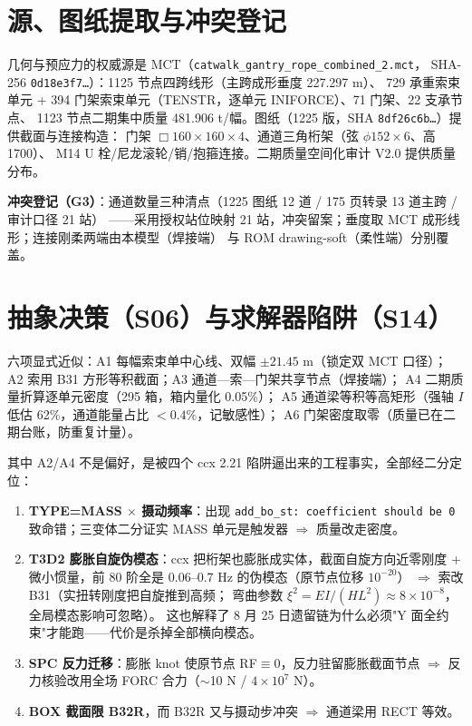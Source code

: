 \documentclass[11pt,a4paper]{ctexart}
\begin{document}
\section{源、图纸提取与冲突登记}

几何与预应力的权威源是 MCT（\texttt{catwalk\_gantry\_rope\_combined\_2.mct}，
SHA-256 \texttt{0d18e3f7\ldots}）：1125 节点四跨线形（主跨成形垂度 227.297 m）、
729 承重索束单元 + 394 门架索束单元（TENSTR，逐单元 INIFORCE）、71 门架、22 支承节点、
1123 节点二期集中质量 481.906 t/幅。图纸（1225 版，SHA \texttt{8df26c6b\ldots}）提供截面与连接构造：
门架 $\Box160\times160\times4$、通道三角桁架（弦 $\phi152\times6$、高 1700）、
M14 U 栓/尼龙滚轮/销/抱箍连接。二期质量空间化审计 V2.0 提供质量分布。

\textbf{冲突登记（G3）}：通道数量三种清点（1225 图纸 12 道 / 175 页转录 13 道主跨 / 审计口径 21 站）
——采用授权站位映射 21 站，冲突留案；垂度取 MCT 成形线形；连接刚柔两端由本模型（焊接端）
与 ROM drawing-soft（柔性端）分别覆盖。

\section{抽象决策（S06）与求解器陷阱（S14）}\label{sec:abs}

六项显式近似：A1 每幅索束单中心线、双幅 $\pm21.45$ m（锁定双 MCT 口径）；
A2 索用 B31 方形等积截面；A3 通道—索—门架共享节点（焊接端）；
A4 二期质量折算逐单元密度（295 箱，箱内量化 0.05\%）；
A5 通道梁等积等高矩形（强轴 $I$ 低估 62\%，通道能量占比 $<0.4\%$，记敏感性）；
A6 门架密度取零（质量已在二期台账，防重复计量）。

其中 A2/A4 不是偏好，是被四个 ccx 2.21 陷阱逼出来的工程事实，全部经二分定位：

\begin{enumerate}
  \item \textbf{TYPE=MASS $\times$ 摄动频率}：出现 \texttt{add\_bo\_st: coefficient should be 0}
        致命错；三变体二分证实 MASS 单元是触发器 $\Rightarrow$ 质量改走密度。
  \item \textbf{T3D2 膨胀自旋伪模态}：ccx 把桁架也膨胀成实体，截面自旋方向近零刚度
        + 微小惯量，前 80 阶全是 0.06--0.7 Hz 的伪模态（原节点位移 $10^{-20}$）
        $\Rightarrow$ 索改 B31（实扭转刚度把自旋推到高频；
        弯曲参数 $\xi^2=EI/(HL^2)\approx8\times10^{-8}$，全局模态影响可忽略）。
        这也解释了 8 月 25 日遗留链为什么必须"Y 面全约束"才能跑——代价是杀掉全部横向模态。
  \item \textbf{SPC 反力迁移}：膨胀 knot 使原节点 RF$\equiv$0，反力驻留膨胀截面节点
        $\Rightarrow$ 反力核验改用全场 FORC 合力（$\sim$10 N / $4\times10^7$ N）。
  \item \textbf{BOX 截面限 B32R}，而 B32R 又与摄动步冲突 $\Rightarrow$ 通道梁用 RECT 等效。
\end{enumerate}
\end{document}
